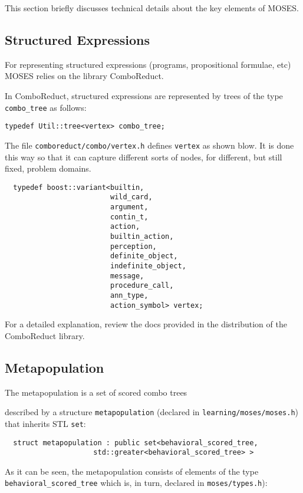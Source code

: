 \documentclass{article}
\begin{document}
This section briefly discusses technical details about the key elements of MOSES.

\subsection{Structured Expressions}

For representing structured expressions (programs, propositional formulae, etc)
MOSES relies on the library ComboReduct.

In ComboReduct, structured expressions are represented 
by trees of the type \verb|combo_tree| as follows:

\verb|typedef Util::tree<vertex> combo_tree;|

The file \verb|comboreduct/combo/vertex.h| defines
\verb|vertex| as shown blow.  It is done this way so that it 
can capture different sorts of nodes, for different, but still
fixed, problem domains.

\begin{verbatim}
  typedef boost::variant<builtin,
                         wild_card,
                         argument,
                         contin_t,
                         action,
                         builtin_action,
                         perception,
                         definite_object,
                         indefinite_object,
                         message,
                         procedure_call,
                         ann_type,
                         action_symbol> vertex;
\end{verbatim}

For a detailed explanation, review the docs provided 
in the distribution of the ComboReduct library.

\subsection{Metapopulation}

The metapopulation is a set of scored combo trees

described by a structure \verb|metapopulation|
(declared in \verb|learning/moses/moses.h|) that inherits STL \verb|set|:

\begin{verbatim}
  struct metapopulation : public set<behavioral_scored_tree,
				     std::greater<behavioral_scored_tree> > 
\end{verbatim}

As it can be seen, the metapopulation consists of elements of the type
\verb|behavioral_scored_tree| which is, in turn, declared in 
\verb|moses/types.h|):
\end{document}
